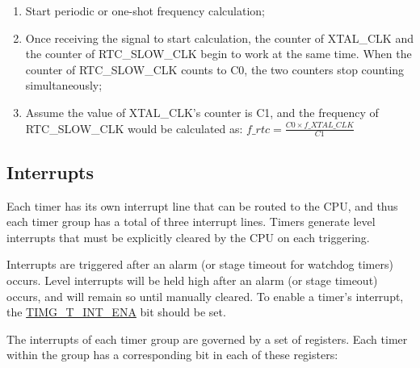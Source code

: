 \documentclass[main\_\_EN.tex]{subfiles}
\begin{document}
\begin{enumerate}
    \item Start periodic or one-shot frequency calculation;
    \item Once receiving the signal to start calculation, the counter of XTAL\_CLK and the counter of RTC\_SLOW\_CLK begin to work at the same time. When the counter of RTC\_SLOW\_CLK counts to C0, the two counters stop counting simultaneously;
    \item Assume the value of XTAL\_CLK's counter is C1, and the frequency of RTC\_SLOW\_CLK would be calculated as:
    $f\_rtc = \frac{C0 \times f\_XTAL\_CLK}{C1}$
\end{enumerate}

\subsection{Interrupts}\label{sec:timg-interrupt}

Each timer has its own interrupt line that can be routed to the CPU, and thus each timer group has a total of three interrupt lines. Timers generate level interrupts that must be explicitly cleared by the CPU on each triggering.

Interrupts are triggered after an alarm (or stage timeout for watchdog timers) occurs. Level interrupts will be held high after an alarm (or stage timeout) occurs, and will remain so until manually cleared. To enable a timer's interrupt, the \hyperref[regdesc:TIMGINTENATIMERSREG]{TIMG\_T\_INT\_ENA} bit should be set.

The interrupts of each timer group are governed by a set of registers. Each timer within the group has a corresponding bit in each of these registers:
\end{document}
